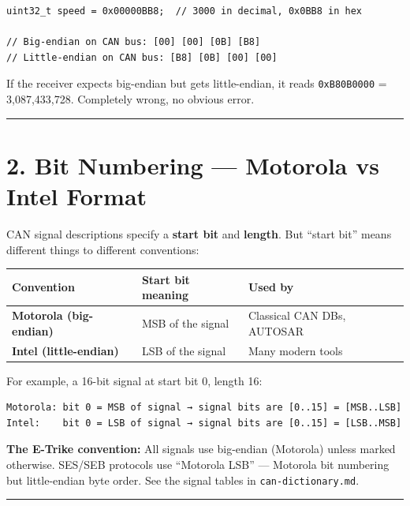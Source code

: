 \documentclass[12pt,a4paper,oneside]{report}
\begin{document}
\begin{verbatim}
uint32_t speed = 0x00000BB8;  // 3000 in decimal, 0x0BB8 in hex

// Big-endian on CAN bus: [00] [00] [0B] [B8]
// Little-endian on CAN bus: [B8] [0B] [00] [00]
\end{verbatim}

If the receiver expects big-endian but gets little-endian, it reads
\texttt{0xB80B0000} = 3,087,433,728. Completely wrong, no obvious error.

\begin{center}\rule{0.5\linewidth}{0.5pt}\end{center}

\section{2. Bit Numbering --- Motorola vs Intel
Format}\label{bit-numbering-motorola-vs-intel-format}

CAN signal descriptions specify a \textbf{start bit} and \textbf{length}. But
``start bit'' means different things to different conventions:

\begin{longtable}[]{@{}lll@{}}
\toprule\noalign{}
Convention & Start bit meaning & Used by \\
\midrule\noalign{}
\endhead
\bottomrule\noalign{}
\endlastfoot
\textbf{Motorola (big-endian)} & MSB of the signal & Classical CAN DBs,
AUTOSAR \\
\textbf{Intel (little-endian)} & LSB of the signal & Many modern tools \\
\end{longtable}

For example, a 16-bit signal at start bit 0, length 16:

\begin{verbatim}
Motorola: bit 0 = MSB of signal → signal bits are [0..15] = [MSB..LSB]
Intel:    bit 0 = LSB of signal → signal bits are [0..15] = [LSB..MSB]
\end{verbatim}

\textbf{The E-Trike convention:} All signals use big-endian (Motorola) unless
marked otherwise. SES/SEB protocols use ``Motorola LSB'' --- Motorola bit
numbering but little-endian byte order. See the signal tables in
\texttt{can-dictionary.md}.

\begin{center}\rule{0.5\linewidth}{0.5pt}\end{center}
\end{document}
